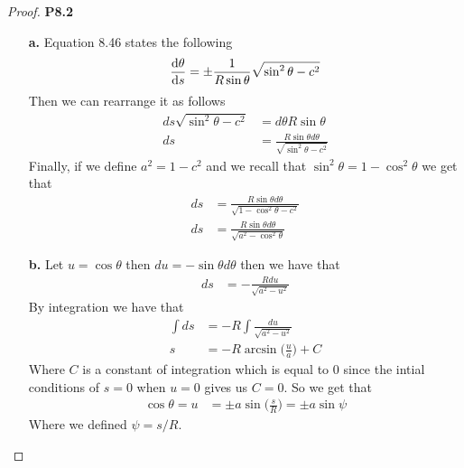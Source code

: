 \documentclass[11pt]{article}
\theoremstyle{definition}
\begin{document}
\cleardoublepage
\begin{proof}{\textbf{P8.2}}
    \begin{itemize}
        \item [\textbf{a.}] Equation 8.46 states the following
        \begin{align*}
            \derivative{\theta}{s}
            = \pm \frac{1}{R\sin\theta}\sqrt{\sin^2\theta - c^2}
        \end{align*}
        Then we can rearrange it as follows
        \begin{align*}
            ds\sqrt{\sin^2\theta - c^2} &= d\theta R\sin\theta\\
            ds &= \frac{R\sin\theta d\theta}{\sqrt{\sin^2\theta - c^2}}
        \end{align*}
        Finally, if we define $a^2 = 1 - c^2$ and we recall that
        $\sin^2\theta = 1 - \cos^2\theta$ we get that
        \begin{align*}
            ds &= \frac{R\sin\theta d\theta}{\sqrt{1 -\cos^2\theta - c^2}}\\
            ds &= \frac{R\sin\theta d\theta}{\sqrt{a^2 -\cos^2\theta}}
        \end{align*}
        \item [\textbf{b.}] Let $u = \cos\theta$ then $du = -\sin\theta d\theta$ then we have that
        \begin{align*}
            ds &= -\frac{Rdu}{\sqrt{a^2 -u^2}}
        \end{align*}
        By integration we have that
        \begin{align*}
            \int ds &= -R\int \frac{du}{\sqrt{a^2 -u^2}}\\
            s &= -R \arcsin\bigg(\frac{u}{a}\bigg) + C
        \end{align*}
        Where $C$ is a constant of integration which is equal to 0 since the
        intial conditions of $s = 0$ when $u = 0$ gives us $C = 0$.
        So we get that 
        \begin{align*}
            \cos\theta = u &= \pm a\sin\bigg(\frac{s}{R}\bigg) = \pm a\sin\psi
        \end{align*}
        Where we defined $\psi = s/R$.


\end{itemize}
\end{proof}
\end{document}
